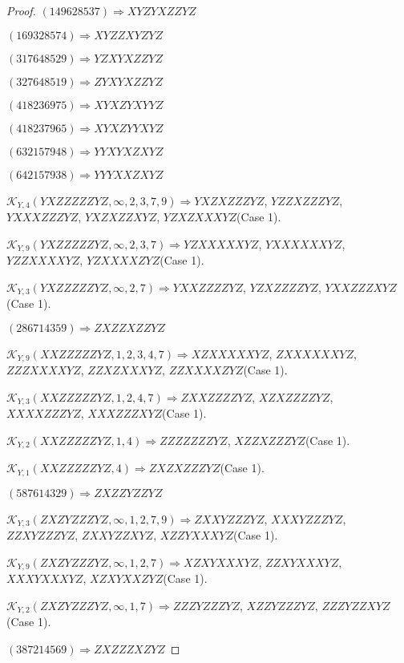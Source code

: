 \documentclass[12pt]{article}
\theoremstyle{plain}
\theoremstyle{definition}
\theoremstyle{remark}
\newcommand{\fancy}[1]{\mathcal{#1}}
\def\K{\fancy{K}}
\begin{document}
\begin{proof}
	$(1 4 9 6 2 8 5 3 7)\Rightarrow XYZYXZZYZ$
	
	$(1 6 9 3 2 8 5 7 4)\Rightarrow XYZZXYZYZ$
	
	$(3 1 7 6 4 8 5 2 9)\Rightarrow YZXYXZZYZ$
	
	$(3 2 7 6 4 8 5 1 9)\Rightarrow ZYXYXZZYZ$
	
	$(4 1 8 2 3 6 9 7 5)\Rightarrow XYXZYXYYZ$
	
	$(4 1 8 2 3 7 9 6 5)\Rightarrow XYXZYYXYZ$
	
	$(6 3 2 1 5 7 9 4 8)\Rightarrow YYXYXZXYZ$
	
	$(6 4 2 1 5 7 9 3 8)\Rightarrow YYYXXZXYZ$
	
	
	
	$\K_{Y,4}(YXZZZZZYZ,\infty,2, 3, 7, 9)\Rightarrow $$YXZXZZZYZ$, $YZZXZZZYZ$, $YXXXZZZYZ$, $YXZXZZXYZ$, $YZXZXXXYZ$(Case 1).
	
	$\K_{Y,9}(YXZZZZZYZ,\infty,2, 3, 7)\Rightarrow $$YZXXXXXYZ$, $YXXXXXXYZ$, $YZZXXXXYZ$, $YZXXXXZYZ$(Case 1).
	
	$\K_{Y,3}(YXZZZZZYZ,\infty,2, 7)\Rightarrow $$YXXZZZZYZ$, $YZXZZZZYZ$, $YXXZZZXYZ$(Case 1).
	
	
	
	$(2 8 6 7 1 4 3 5 9)\Rightarrow ZXZZXZZYZ$
	
	
	
	$\K_{Y,9}(XXZZZZZYZ,1, 2, 3, 4, 7)\Rightarrow $$XZXXXXXYZ$, $ZXXXXXXYZ$, $ZZZXXXXYZ$, $ZZXZXXXYZ$, $ZZXXXXZYZ$(Case 1).
	
	$\K_{Y,3}(XXZZZZZYZ,1, 2, 4, 7)\Rightarrow $$ZXXZZZZYZ$, $XZXZZZZYZ$, $XXXXZZZYZ$, $XXXZZZXYZ$(Case 1).
	
	$\K_{Y,2}(XXZZZZZYZ,1, 4)\Rightarrow $$ZZZZZZZYZ$, $XZZXZZZYZ$(Case 1).
	
	$\K_{Y,1}(XXZZZZZYZ,4)\Rightarrow $$ZXZXZZZYZ$(Case 1).
	
	
	
	$(5 8 7 6 1 4 3 2 9)\Rightarrow ZXZZYZZYZ$
	
	
	
	$\K_{Y,3}(ZXZYZZZYZ,\infty,1, 2, 7, 9)\Rightarrow $$ZXXYZZZYZ$, $XXXYZZZYZ$, $ZZXYZZZYZ$, $ZXXYZZXYZ$, $XZZYXXXYZ$(Case 1).
	
	$\K_{Y,9}(ZXZYZZZYZ,\infty,1, 2, 7)\Rightarrow $$XZXYXXXYZ$, $ZZXYXXXYZ$, $XXXYXXXYZ$, $XZXYXXZYZ$(Case 1).
	
	$\K_{Y,2}(ZXZYZZZYZ,\infty,1, 7)\Rightarrow $$ZZZYZZZYZ$, $XZZYZZZYZ$, $ZZZYZZXYZ$(Case 1).
	
	
	
	$(3 8 7 2 1 4 5 6 9)\Rightarrow ZXZZZXZYZ$
	

\end{proof}
\end{document}

